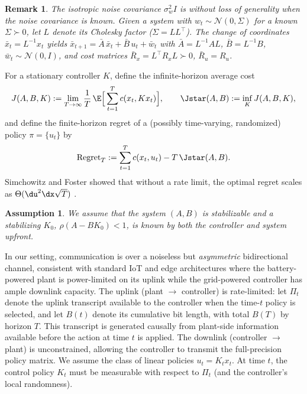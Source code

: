 \documentclass[11pt,journal,onecolumn]{IEEEtran}
\newtheorem{assumption}{Assumption}
\newtheorem{remark}{Remark}
\begin{document}
\begin{remark}
    The isotropic noise covariance $\sigma_w^2 I$ is without loss of generality when the noise covariance is known. Given a system with $w_t \sim \mathcal{N}(0, \Sigma)$ for a known $\Sigma \succ 0$, let $L$ denote its Cholesky factor ($\Sigma = LL^\top$). The change of coordinates $\bar{x}_t = L^{-1} x_t$ yields $\bar{x}_{t+1} = \bar{A}\,\bar{x}_t + \bar{B}\,u_t + \bar{w}_t$ with $\bar{A} = L^{-1}AL$, $\bar{B} = L^{-1}B$, $\bar{w}_t \sim \mathcal{N}(0, I)$, and cost matrices $\bar{R}_x = L^\top R_x L \succ 0$, $\bar{R}_u = R_u$.
\end{remark}
For a stationary controller \(K\), define the infinite-horizon average cost
\begin{equation} \label{cost}
    J(A,B,K) := \lim_{T\to\infty}\frac{1}{T}\,\E  \Big[\sum_{t=1}^T c(x_t,Kx_t)\Big],
    \qquad
    \Jstar(A,B):=\inf_K J(A,B,K),
\end{equation}
and define the finite-horizon regret of a (possibly time-varying, randomized) policy \(\pi=\{u_t\}\) by
\begin{equation}
    \mathrm{Regret}_T := \sum_{t=1}^T c(x_t,u_t)  -  T\,\Jstar(A,B).
    \label{eq:regret}
\end{equation}
Simchowitz and Foster showed that without a rate limit, the optimal regret scales as $\Theta(\du^2 \dx\sqrt{T})$ \cite{simchowitz20a}.

\begin{assumption} \label{asm:pre}
    We assume that the system $(A,B)$ is stabilizable and a stabilizing $K_0$, $\rho(A - BK_0) < 1$, is known by both the controller and system upfront.
\end{assumption}

In our setting, communication is over a noiseless but \emph{asymmetric} bidirectional channel, consistent with standard IoT and edge architectures where the battery-powered plant is power-limited on its uplink while the grid-powered controller has ample downlink capacity. The uplink (plant $\to$ controller) is rate-limited: let \(\Pi_t\) denote the uplink transcript available to the controller when the time-$t$ policy is selected, and let \(B(t)\) denote its cumulative bit length, with total \(B(T)\) by horizon \(T\). This transcript is generated causally from plant-side information available before the action at time $t$ is applied. The downlink (controller $\to$ plant) is unconstrained, allowing the controller to transmit the full-precision policy matrix. We assume the class of linear policies $u_t = K_t x_t$. At time \(t\), the control policy $K_t$ must be measurable with respect to \(\Pi_t\) (and the controller's local randomness).
\end{document}
